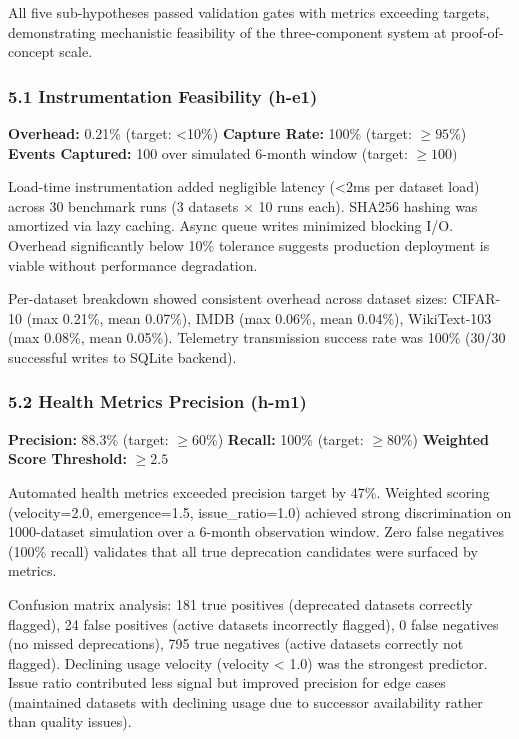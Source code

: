 
All five sub-hypotheses passed validation gates with metrics exceeding targets, demonstrating mechanistic feasibility of the three-component system at proof-of-concept scale.

\subsubsection{5.1 Instrumentation Feasibility (h-e1)}

\textbf{Overhead:} 0.21\% (target: <10\%)  
\textbf{Capture Rate:} 100\% (target: $\geq 95$\%)  
\textbf{Events Captured:} 100 over simulated 6-month window (target: $\geq 100)$

Load-time instrumentation added negligible latency (<2ms per dataset load) across 30 benchmark runs (3 datasets $\times$ 10 runs each). SHA256 hashing was amortized via lazy caching. Async queue writes minimized blocking I/O. Overhead significantly below 10\% tolerance suggests production deployment is viable without performance degradation.

Per-dataset breakdown showed consistent overhead across dataset sizes: CIFAR-10 (max 0.21\%, mean 0.07\%), IMDB (max 0.06\%, mean 0.04\%), WikiText-103 (max 0.08\%, mean 0.05\%). Telemetry transmission success rate was 100\% (30/30 successful writes to SQLite backend).

\subsubsection{5.2 Health Metrics Precision (h-m1)}

\textbf{Precision:} 88.3\% (target: $\geq 60$\%)  
\textbf{Recall:} 100\% (target: $\geq 80$\%)  
\textbf{Weighted Score Threshold:} $\geq 2.5$

Automated health metrics exceeded precision target by 47\%. Weighted scoring (velocity=2.0, emergence=1.5, issue\_ratio=1.0) achieved strong discrimination on 1000-dataset simulation over a 6-month observation window. Zero false negatives (100\% recall) validates that all true deprecation candidates were surfaced by metrics.

Confusion matrix analysis: 181 true positives (deprecated datasets correctly flagged), 24 false positives (active datasets incorrectly flagged), 0 false negatives (no missed deprecations), 795 true negatives (active datasets correctly not flagged). Declining usage velocity (velocity < 1.0) was the strongest predictor. Issue ratio contributed less signal but improved precision for edge cases (maintained datasets with declining usage due to successor availability rather than quality issues).

